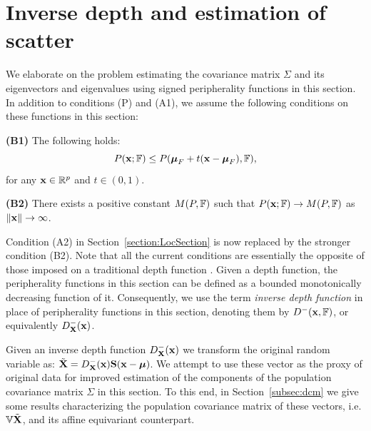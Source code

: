 \section{Inverse depth and estimation of scatter}
\label{section:dcmSection}
We elaborate on the problem estimating the covariance matrix $\Sigma$ and its eigenvectors and eigenvalues using signed peripherality functions in this section. In addition to conditions (P) and (A1), we assume the following conditions on these functions in this section:

\vspace{1em}
\noindent\textbf{(B1)} The following holds:
$$
P({\bf{x}}; {\mathbb{F}}) \leq P({\boldsymbol{\mu}}_F + t({\bf{x}} - {\boldsymbol{\mu}}_F), {\mathbb{F}}),
$$
%
for any ${\bf{x}} \in {\mathbb{R}}^p$ and $t \in (0,1)$.

\noindent\textbf{(B2)} There exists a positive constant $M(P,{\mathbb{F}}) $ such that $P({\bf{x}}; {\mathbb{F}}) \rightarrow M(P,{\mathbb{F}})$ as $\|{\bf{x}}\| \rightarrow \infty $.
\vspace{1em}

Condition (A2) in Section~\ref{section:LocSection} is now replaced by the stronger condition (B2). Note that all the current conditions are essentially the opposite of those imposed on a traditional depth function \citep{zuo00}. Given a depth function, the peripherality functions in this section can be defined as a bounded monotonically decreasing function of it. Consequently, we use the term {\it inverse depth function} in place of peripherality functions in this section, denoting them by $D^-({\bf{x}},{\mathbb{F}})$, or equivalently $D^-_{\mathbf{X}}({\bf{x}})$.

Given an inverse depth function $D^-_{{\mathbf{X}}}({\bf{x}})$ we transform the original random variable as: $\tilde {{\mathbf{X}}} = D^-_{\mathbf{X}}({\bf{x}}) {\mathbf{S}}({\bf{x}} - {\boldsymbol{\mu}})$. We attempt to use these vector as the proxy of original data for improved estimation of the components of the population covariance matrix $\Sigma$ in this section. To this end, in Section~\ref{subsec:dcm} we give some results characterizing the population covariance matrix of these vectors, i.e. ${\mathbb{V}} \tilde {{\mathbf{X}}}$, and its affine equivariant counterpart.


